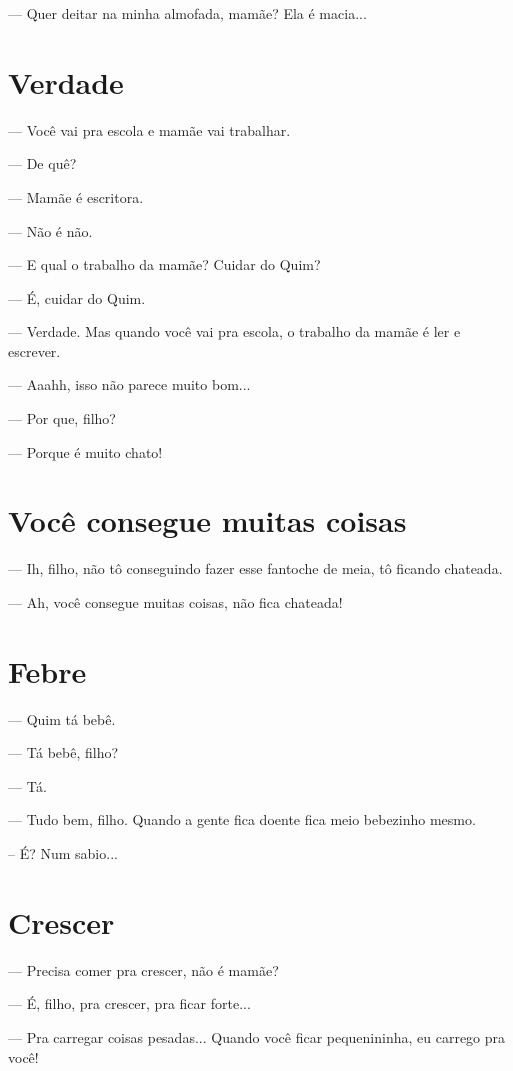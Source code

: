 {--- Quer deitar na minha almofada, mamãe? Ela é macia...

\chapter{Verdade}\label{verdade}

--- Você vai pra escola e mamãe vai trabalhar.

--- De quê?

--- Mamãe é escritora.

--- Não é não.

--- E qual o trabalho da mamãe? Cuidar do Quim?

--- É, cuidar do Quim.

--- Verdade. Mas quando você vai pra escola, o trabalho da mamãe é ler e
escrever.

--- Aaahh, isso não parece muito bom...

--- Por que, filho?

--- Porque é muito chato!

\chapter{Você consegue muitas
coisas}\label{vocuxea-consegue-muitas-coisas}

--- Ih, filho, não tô conseguindo fazer esse fantoche de meia, tô
ficando chateada.

--- Ah, você consegue muitas coisas, não fica chateada!

\chapter{Febre}\label{febre}

--- Quim tá bebê.

--- Tá bebê, filho?

--- Tá.

--- Tudo bem, filho. Quando a gente fica doente fica meio bebezinho
mesmo.

-- É? Num sabio...

\chapter{Crescer}\label{crescer}

--- Precisa comer pra crescer, não é mamãe?

--- É, filho, pra crescer, pra ficar forte...

--- Pra carregar coisas pesadas... Quando você ficar pequenininha, eu
carrego pra você!

}
